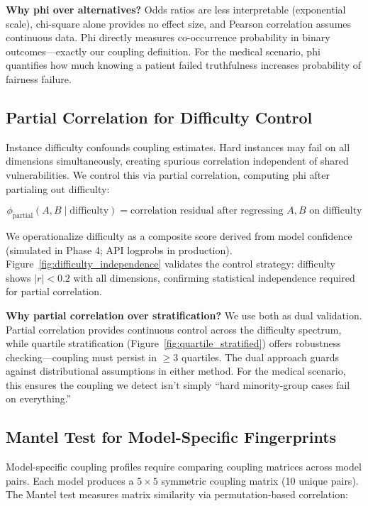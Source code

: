\textbf{Why phi over alternatives?} Odds ratios are less interpretable (exponential scale), chi-square alone provides no effect size, and Pearson correlation assumes continuous data. Phi directly measures co-occurrence probability in binary outcomes---exactly our coupling definition. For the medical scenario, phi quantifies how much knowing a patient failed truthfulness increases probability of fairness failure.

\subsection{Partial Correlation for Difficulty Control}

Instance difficulty confounds coupling estimates. Hard instances may fail on all dimensions simultaneously, creating spurious correlation independent of shared vulnerabilities. We control this via partial correlation, computing phi after partialing out difficulty:

\[
\phi_{\text{partial}}(A, B \mid \text{difficulty}) = \text{correlation residual after regressing } A, B \text{ on difficulty}
\]

We operationalize difficulty as a composite score derived from model confidence (simulated in Phase 4; API logprobs in production). Figure~\ref{fig:difficulty_independence} validates the control strategy: difficulty shows $|r| < 0.2$ with all dimensions, confirming statistical independence required for partial correlation.

\textbf{Why partial correlation over stratification?} We use both as dual validation. Partial correlation provides continuous control across the difficulty spectrum, while quartile stratification (Figure~\ref{fig:quartile_stratified}) offers robustness checking---coupling must persist in $\geq$3 quartiles. The dual approach guards against distributional assumptions in either method. For the medical scenario, this ensures the coupling we detect isn't simply ``hard minority-group cases fail on everything.''

\subsection{Mantel Test for Model-Specific Fingerprints}

Model-specific coupling profiles require comparing coupling matrices across model pairs. Each model produces a $5\times5$ symmetric coupling matrix (10 unique pairs). The Mantel test measures matrix similarity via permutation-based correlation:

